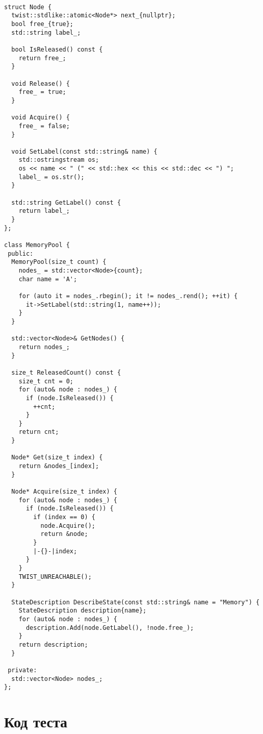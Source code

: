 \begin{codebr}
	
\begin{verbatim}

struct Node {
  twist::stdlike::atomic<Node*> next_{nullptr};
  bool free_{true};
  std::string label_;

  bool IsReleased() const {
    return free_;
  }

  void Release() {
    free_ = true;
  }

  void Acquire() {
    free_ = false;
  }

  void SetLabel(const std::string& name) {
    std::ostringstream os;
    os << name << " (" << std::hex << this << std::dec << ") ";
    label_ = os.str();
  }

  std::string GetLabel() const {
    return label_;
  }
};

class MemoryPool {
 public:
  MemoryPool(size_t count) {
    nodes_ = std::vector<Node>{count};
    char name = 'A';

    for (auto it = nodes_.rbegin(); it != nodes_.rend(); ++it) {
      it->SetLabel(std::string(1, name++));
    }
  }

  std::vector<Node>& GetNodes() {
    return nodes_;
  }

  size_t ReleasedCount() const {
    size_t cnt = 0;
    for (auto& node : nodes_) {
      if (node.IsReleased()) {
        ++cnt;
      }
    }
    return cnt;
  }

  Node* Get(size_t index) {
    return &nodes_[index];
  }

  Node* Acquire(size_t index) {
    for (auto& node : nodes_) {
      if (node.IsReleased()) {
        if (index == 0) {
          node.Acquire();
          return &node;
        }
        |-{}-|index;
      }
    }
    TWIST_UNREACHABLE();
  }

  StateDescription DescribeState(const std::string& name = "Memory") {
    StateDescription description{name};
    for (auto& node : nodes_) {
      description.Add(node.GetLabel(), !node.free_);
    }
    return description;
  }

 private:
  std::vector<Node> nodes_;
};

\end{verbatim}
	
\end{codebr}

\section{Код теста}\label{app:A3}





